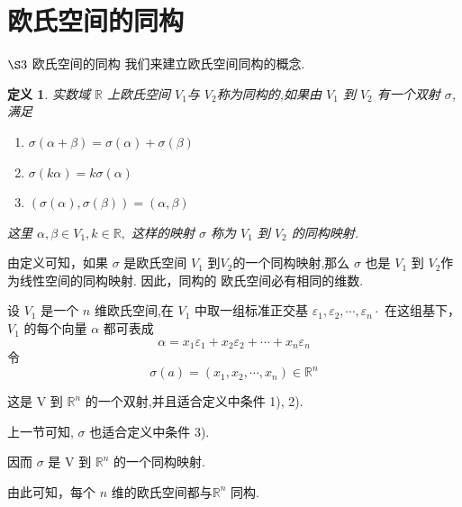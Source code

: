 \documentclass[13pt]{beamer}
\newtheorem*{defi}{定义}
\def\R{\mathbb{R}}
\begin{document}
\section{欧氏空间的同构}
\begin{frame}{$\S 3$ 欧氏空间的同构}
我们来建立欧氏空间同构的概念.  

\begin{defi}
 实数域 $\mathbb{R}$ 上欧氏空间 $V_1$与 $V_2$称为同构的,如果由 $V_1$ 到 $V_2$ 有一个双射 $\sigma$,满足
\begin{enumerate}
	\item $\sigma({\alpha}+{\beta})=\sigma({\alpha})+\sigma({\beta})$
	\item $\sigma(k {\alpha})=k \sigma({\alpha})$
	\item $(\sigma({\alpha}), \sigma({\beta}))=({\alpha}, {\beta})$
\end{enumerate}
这里 ${\alpha}, {\beta} \in V_1, k \in {\R},$ 这样的映射 $\sigma$ 称为 $V_1$ 到 $V_2$ 的同构映射. 
\end{defi}
由定义可知，如果 $\sigma$ 是欧氏空间 $V_1$ 到$V_2$的一个同构映射,那么 $\sigma$ 也是 $V_1$ 到 $V_2$作为线性空间的同构映射.
因此，同构的 欧氏空间必有相同的维数.
\end{frame}



\begin{frame}
设 $V_1$ 是一个 $n$ 维欧氏空间,在 $V_1$ 中取一组标准正交基 ${\varepsilon}_{1}, {\varepsilon}_{2}, \cdots, {\varepsilon}_{n} \cdot$ 在这组基下， $V_1$ 的每个向量 ${\alpha}$ 都可表成
\[
{\alpha}= {x}_{1} {\varepsilon}_{1}+x_{2} {{\varepsilon}}_{2}+\cdots+x_{n} {\varepsilon}_{n}
\]
令
\[
\sigma({a})=\left(x_{1}, x_{2}, \cdots, x_{n}\right) \in \mathbb{R}^n
\]

这是 V 到 $\mathbb{R}^n$ 的一个双射,并且适合定义中条件 1), 2).

上一节可知, $\sigma$ 也适合定义中条件 3).

因而 $\sigma$ 是 V 到 $\mathbb{R}^n$ 的一个同构映射.

由此可知，每个 $n$ 维的欧氏空间都与$\mathbb{R}^n$ 同构. 

\end{frame}
\end{document}
